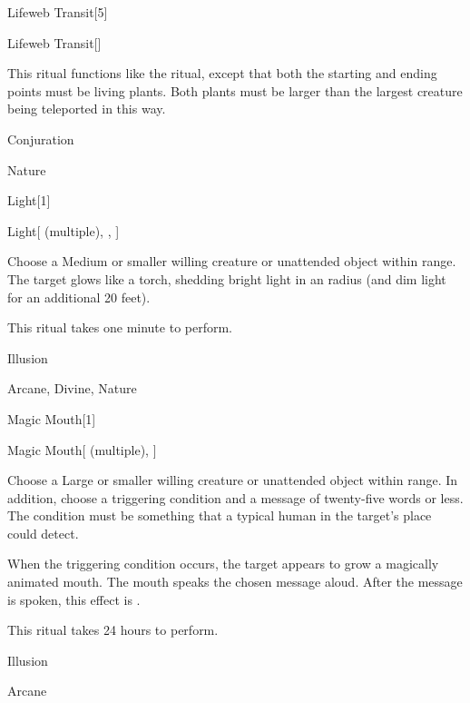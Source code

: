 \begin{spellsection}{Lifeweb Transit}[5]


\begin{ability}{Lifeweb Transit}[]

This ritual functions like the  ritual, except that both the starting and ending points must be living plants.
Both plants must be larger than the largest creature being teleported in this way.

\end{ability}




 Conjuration

 Nature
\end{spellsection}


\begin{spellsection}{Light}[1]


\begin{ability}{Light}[ (multiple), , ]

Choose a Medium or smaller willing creature or unattended object within \rngclose range.
The target glows like a torch, shedding bright light in an \areamed radius (and dim light for an additional 20 feet).

This ritual takes one minute to perform.

\end{ability}




 Illusion

 Arcane, Divine, Nature
\end{spellsection}


\begin{spellsection}{Magic Mouth}[1]


\begin{ability}{Magic Mouth}[ (multiple), ]

Choose a Large or smaller willing creature or unattended object within \rngclose range.
In addition, choose a triggering condition and a message of twenty-five words or less.
The condition must be something that a typical human in the target's place could detect.

When the triggering condition occurs, the target appears to grow a magically animated mouth.
The mouth speaks the chosen message aloud.
After the message is spoken, this effect is .

This ritual takes 24 hours to perform.

\end{ability}




 Illusion

 Arcane
\end{spellsection}



